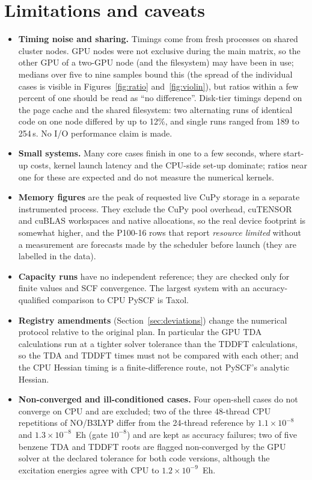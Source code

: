 \section{Limitations and caveats}
\label{sec:limits}

\begin{itemize}[leftmargin=*,itemsep=2pt]
\item \textbf{Timing noise and sharing.} Timings come from fresh processes on shared cluster nodes. GPU nodes were not exclusive during the main matrix, so the other GPU of a two-GPU node (and the filesystem) may have been in use; medians over five to nine samples bound this (the spread of the individual cases is visible in Figures~\ref{fig:ratio} and~\ref{fig:violin}), but ratios within a few percent of one should be read as ``no difference''. Disk-tier timings depend on the page cache and the shared filesystem: two alternating runs of identical code on one node differed by up to 12\%, and single runs ranged from 189 to 254\,s. No I/O performance claim is made.
\item \textbf{Small systems.} Many core cases finish in one to a few seconds, where start-up costs, kernel launch latency and the CPU-side set-up dominate; ratios near one for these are expected and do not measure the numerical kernels.
\item \textbf{Memory figures} are the peak of requested live CuPy storage in a separate instrumented process. They exclude the CuPy pool overhead, cuTENSOR and cuBLAS workspaces and native allocations, so the real device footprint is somewhat higher, and the P100-16 rows that report \emph{resource limited} without a measurement are forecasts made by the scheduler before launch (they are labelled in the data).
\item \textbf{Capacity runs} have no independent reference; they are checked only for finite values and SCF convergence. The largest system with an accuracy-qualified comparison to CPU PySCF is Taxol.
\item \textbf{Registry amendments} (Section~\ref{sec:deviations}) change the numerical protocol relative to the original plan. In particular the GPU TDA calculations run at a tighter solver tolerance than the TDDFT calculations, so the TDA and TDDFT times must not be compared with each other; and the CPU Hessian timing is a finite-difference route, not PySCF's analytic Hessian.
\item \textbf{Non-converged and ill-conditioned cases.} Four open-shell cases do not converge on CPU and are excluded; two of the three 48-thread CPU repetitions of NO/B3LYP differ from the 24-thread reference by $1.1\times10^{-8}$ and $1.3\times10^{-8}$~Eh (gate $10^{-8}$) and are kept as accuracy failures; two of five benzene TDA and TDDFT roots are flagged non-converged by the GPU solver at the declared tolerance for both code versions, although the excitation energies agree with CPU to $1.2\times10^{-9}$~Eh.

\end{itemize}
